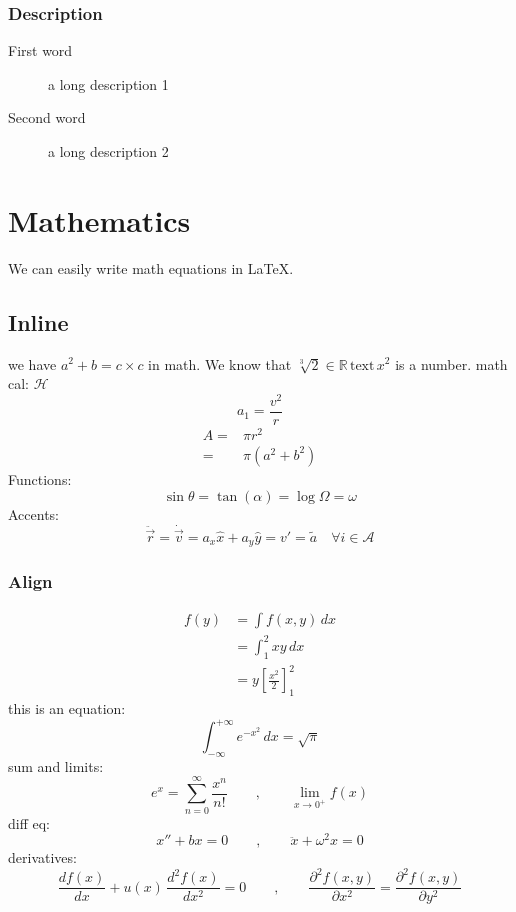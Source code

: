 \documentclass[12pt]{article}
\begin{document}
	\subsubsection{Description}
	\begin{description}
		\item[First word] a long description 1
		\item[Second word] a long description 2
	\end{description}
	
	\section{Mathematics}
	We can easily write math equations in \LaTeX.
	\subsection{Inline}
	we have $a^2+b=c\times c$ in math. We know that $\sqrt[3]{2} \in \mathbb{R} \, \text{text} \, x^2 $ is a number. math cal: $\mathcal{H}$
	\begin{equation}
		a_1 = \frac{v^2}{r}
	\end{equation}
	\begin{equation}
		\begin{split}
			A =& \pi r^2 \\
			 =& \pi (a^2 + b^2)
		\end{split}
	\end{equation}
	Functions:
	\[  \sin \theta = \tan{(\alpha)} = \log{\Omega} = \omega\]
	Accents:
	\[ \ddot{\vec{r}} = \dot{\vec{v}} = a_x \hat{x} + a_y \hat{y} = v' = \tilde{a} \quad \forall i \in \mathcal{A} \]
	\subsubsection{Align}
	\begin{align}
		f(y) &= \int f(x,y) \, dx \\
		&= \int_1^2 xy \, dx  \\
		&= y \left[ \frac{x^2}{2} \right]_1^2
		\label{eq1}
	\end{align}
	this is an equation:
	\[ \int_{-\infty}^{+\infty} e^{-x^2} \, dx = \sqrt{\pi}\]
	sum and limits:
	\[ e^x = \sum_{n=0}^\infty \frac{x^n}{n!} \qquad , \qquad \lim_{x\to 0^+} f(x)\]
	diff eq:
	\[ x'' + bx = 0 \qquad , \qquad \ddot{x} + \omega^2 x = 0\]
	derivatives:
	\[ \frac{df(x)}{dx} + u(x)\, \frac{d^2f(x)}{dx^2} = 0 \qquad, \qquad \frac{\partial^2 f(x,y)}{\partial x^2} = \frac{\partial^2 f(x,y)}{\partial y^2}\]
\end{document}
